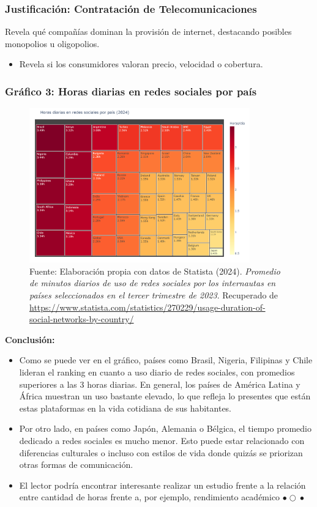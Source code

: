 \documentclass[12pt, a4paper]{article}
\begin{document}
\subsubsection*{Justificación: Contratación de Telecomunicaciones}
Revela qué compañías dominan la provisión de internet, destacando posibles monopolios u oligopolios.
\begin{itemize}
    \item Revela si los consumidores valoran precio, velocidad o cobertura.
\end{itemize}

\subsubsection*{Gráfico 3: Horas diarias en redes sociales por país}
\begin{figure}[H]
    \centering
    \includegraphics[width=0.85\textwidth]{images/graph1_JG.png}
    \caption{
        Fuente: Elaboración propia con datos de Statista (2024). 
        \textit{Promedio de minutos diarios de uso de redes sociales por los internautas en países seleccionados en el tercer trimestre de 2023}. 
        Recuperado de \url{https://www.statista.com/statistics/270229/usage-duration-of-social-networks-by-country/}
    }
\end{figure}

\newpage
\textbf{Conclusión:}  
\begin{itemize}
    \item Como se puede ver en el gráfico, países como Brasil, Nigeria, Filipinas y Chile lideran el ranking en cuanto a uso diario de redes sociales, con promedios superiores a las 3 horas diarias. En general, los países de América Latina y África muestran un uso bastante elevado, lo que refleja lo presentes que están estas plataformas en la vida cotidiana de sus habitantes.
    \item Por otro lado, en países como Japón, Alemania o Bélgica, el tiempo promedio dedicado a redes sociales es mucho menor. Esto puede estar relacionado con diferencias culturales o incluso con estilos de vida donde quizás se priorizan otras formas de comunicación.
    \item El lector podría encontrar interesante realizar un estudio frente a la relación entre cantidad de horas frente a, por ejemplo, rendimiento académico $\bullet{}\bigcirc{}\bullet{}$
\end{itemize}
\end{document}
